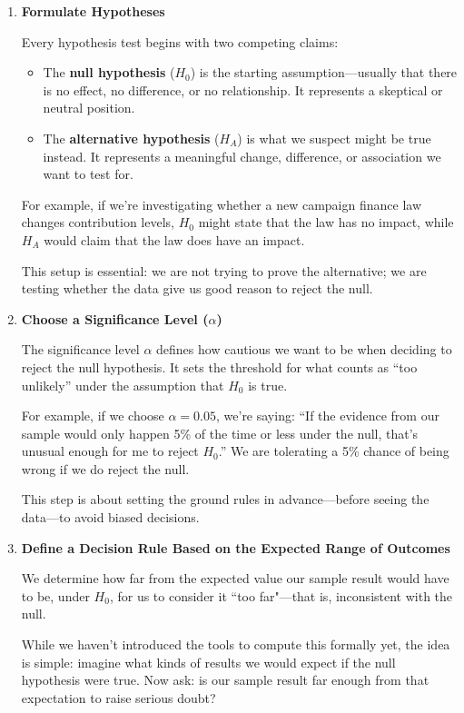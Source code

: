 \documentclass[12pt]{article}
\begin{document}
\begin{enumerate}
  \item \textbf{Formulate Hypotheses}
  
  Every hypothesis test begins with two competing claims:
  
  \begin{itemize}
    \item The \textbf{null hypothesis} ($H_0$) is the starting assumption—usually that there is no effect, no difference, or no relationship. It represents a skeptical or neutral position.
    \item The \textbf{alternative hypothesis} ($H_A$) is what we suspect might be true instead. It represents a meaningful change, difference, or association we want to test for.
  \end{itemize}

  For example, if we're investigating whether a new campaign finance law changes contribution levels, $H_0$ might state that the law has no impact, while $H_A$ would claim that the law does have an impact.

  This setup is essential: we are not trying to prove the alternative; we are testing whether the data give us good reason to reject the null.

  \item \textbf{Choose a Significance Level ($\alpha$)}

  The significance level $\alpha$ defines how cautious we want to be when deciding to reject the null hypothesis. It sets the threshold for what counts as “too unlikely” under the assumption that $H_0$ is true.

  For example, if we choose $\alpha = 0.05$, we're saying: “If the evidence from our sample would only happen 5\% of the time or less under the null, that’s unusual enough for me to reject $H_0$.” We are tolerating a 5\% chance of being wrong if we do reject the null.

  This step is about setting the ground rules in advance—before seeing the data—to avoid biased decisions.

  \item \textbf{Define a Decision Rule Based on the Expected Range of Outcomes}

  We determine how far from the expected value our sample result would have to be, under $H_0$, for us to consider it ``too far"—that is, inconsistent with the null.

  While we haven't introduced the tools to compute this formally yet, the idea is simple: imagine what kinds of results we would expect if the null hypothesis were true. Now ask: is our sample result far enough from that expectation to raise serious doubt?


\end{enumerate}
\end{document}
